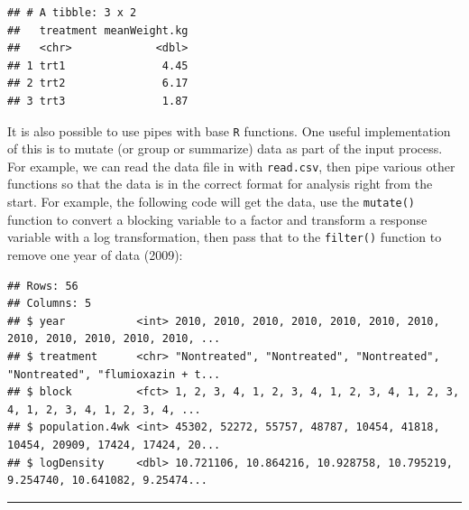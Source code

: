 \documentclass[letterpaper,]{book}
\newenvironment{Shaded}{\begin{snugshade}}{\end{snugshade}}
\newcommand{\DataTypeTok}[1]{\textcolor[rgb]{0.13,0.29,0.53}{#1}}
\newcommand{\DecValTok}[1]{\textcolor[rgb]{0.00,0.00,0.81}{#1}}
\newcommand{\FloatTok}[1]{\textcolor[rgb]{0.00,0.00,0.81}{#1}}
\newcommand{\KeywordTok}[1]{\textcolor[rgb]{0.13,0.29,0.53}{\textbf{#1}}}
\newcommand{\NormalTok}[1]{#1}
\newcommand{\OperatorTok}[1]{\textcolor[rgb]{0.81,0.36,0.00}{\textbf{#1}}}
\newcommand{\StringTok}[1]{\textcolor[rgb]{0.31,0.60,0.02}{#1}}
\begin{document}
\begin{verbatim}
## # A tibble: 3 x 2
##   treatment meanWeight.kg
##   <chr>             <dbl>
## 1 trt1               4.45
## 2 trt2               6.17
## 3 trt3               1.87
\end{verbatim}

It is also possible to use pipes with base \texttt{R} functions. One useful implementation of this is to mutate (or group or summarize) data as part of the input process. For example, we can read the data file in with \texttt{read.csv}, then pipe various other functions so that the data is in the correct format for analysis right from the start. For example, the following code will get the data, use the \texttt{mutate()} function to convert a blocking variable to a factor and transform a response variable with a log transformation, then pass that to the \texttt{filter()} function to remove one year of data (2009):

\begin{Shaded}
\end{Shaded}

\begin{verbatim}
## Rows: 56
## Columns: 5
## $ year           <int> 2010, 2010, 2010, 2010, 2010, 2010, 2010, 2010, 2010, 2010, 2010, 2010, ...
## $ treatment      <chr> "Nontreated", "Nontreated", "Nontreated", "Nontreated", "flumioxazin + t...
## $ block          <fct> 1, 2, 3, 4, 1, 2, 3, 4, 1, 2, 3, 4, 1, 2, 3, 4, 1, 2, 3, 4, 1, 2, 3, 4, ...
## $ population.4wk <int> 45302, 52272, 55757, 48787, 10454, 41818, 10454, 20909, 17424, 17424, 20...
## $ logDensity     <dbl> 10.721106, 10.864216, 10.928758, 10.795219, 9.254740, 10.641082, 9.25474...
\end{verbatim}

\begin{center}\rule{0.5\linewidth}{0.5pt}\end{center}
\end{document}
